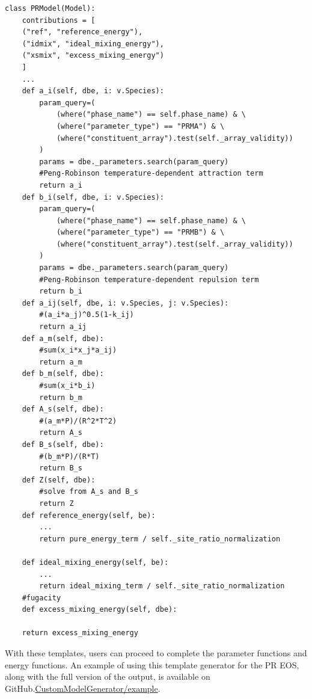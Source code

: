 \begin{verbatim}
class PRModel(Model):
    contributions = [
	("ref", "reference_energy"),
	("idmix", "ideal_mixing_energy"),
	("xsmix", "excess_mixing_energy")
	]
    ...
    def a_i(self, dbe, i: v.Species):
    	param_query=(
			(where("phase_name") == self.phase_name) & \
			(where("parameter_type") == "PRMA") & \
			(where("constituent_array").test(self._array_validity))
		)
		params = dbe._parameters.search(param_query)
    	#Peng-Robinson temperature-dependent attraction term
    	return a_i
    def b_i(self, dbe, i: v.Species):
    	param_query=(
			(where("phase_name") == self.phase_name) & \
			(where("parameter_type") == "PRMB") & \
			(where("constituent_array").test(self._array_validity))
		)
		params = dbe._parameters.search(param_query)
    	#Peng-Robinson temperature-dependent repulsion term
    	return b_i
    def a_ij(self, dbe, i: v.Species, j: v.Species):
    	#(a_i*a_j)^0.5(1-k_ij)
    	return a_ij
    def a_m(self, dbe):
    	#sum(x_i*x_j*a_ij)
    	return a_m
    def b_m(self, dbe):
    	#sum(x_i*b_i)
    	return b_m
    def A_s(self, dbe):
    	#(a_m*P)/(R^2*T^2)
    	return A_s
    def B_s(self, dbe):
    	#(b_m*P)/(R*T)
    	return B_s
    def Z(self, dbe):
    	#solve from A_s and B_s
    	return Z    
    def reference_energy(self, be):
        ...
        return pure_energy_term / self._site_ratio_normalization

    def ideal_mixing_energy(self, be):
        ...
        return ideal_mixing_term / self._site_ratio_normalization
    #fugacity
    def excess_mixing_energy(self, dbe):
    	
	return excess_mixing_energy
\end{verbatim}
With these templates, users can proceed to complete the parameter functions and energy functions. An example of using this template generator for the PR EOS, along with the full version of the output, is available on GitHub.\href{https://github.com/RushiGong/CustomModelGenerator/tree/main/example}{CustomModelGenerator/example}.


